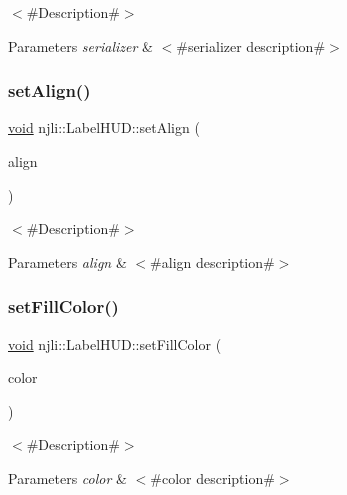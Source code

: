 $<$\#\+Description\#$>$


\begin{DoxyParams}{Parameters}
{\em serializer} & $<$\#serializer description\#$>$ \\
\hline
\end{DoxyParams}
\mbox{\label{classnjli_1_1_label_h_u_d_a6950d61495c1391048e780c1de548519}} 
\subsubsection{\texorpdfstring{set\+Align()}{setAlign()}}
{\footnotesize\ttfamily \mbox{\hyperlink{_thread_8h_af1e856da2e658414cb2456cb6f7ebc66}{void}} njli\+::\+Label\+H\+U\+D\+::set\+Align (\begin{DoxyParamCaption}\item[{\mbox{\hyperlink{_util_8h_aa62c75d314a0d1f37f79c4b73b2292e2}{s32}}}]{align }\end{DoxyParamCaption})}

$<$\#\+Description\#$>$


\begin{DoxyParams}{Parameters}
{\em align} & $<$\#align description\#$>$ \\
\hline
\end{DoxyParams}
\mbox{\label{classnjli_1_1_label_h_u_d_a3a7058fd10326abad7c3ad61b976dae6}} 
\subsubsection{\texorpdfstring{set\+Fill\+Color()}{setFillColor()}}
{\footnotesize\ttfamily \mbox{\hyperlink{_thread_8h_af1e856da2e658414cb2456cb6f7ebc66}{void}} njli\+::\+Label\+H\+U\+D\+::set\+Fill\+Color (\begin{DoxyParamCaption}\item[{const bt\+Vector4 \&}]{color }\end{DoxyParamCaption})}

$<$\#\+Description\#$>$


\begin{DoxyParams}{Parameters}
{\em color} & $<$\#color description\#$>$ \\
\hline
\end{DoxyParams}
\mbox{\label{classnjli_1_1_label_h_u_d_aaa414bebfb2c580b721e9ac8cb5d2284}} 
